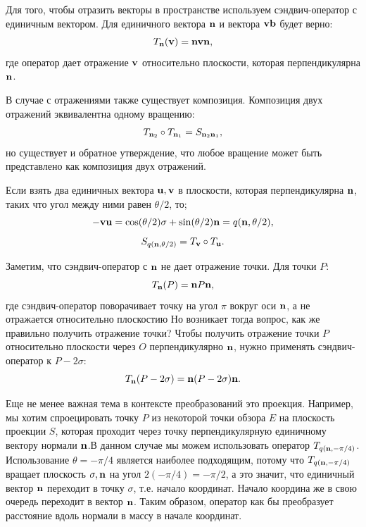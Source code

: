 Для того, чтобы отразить векторы в пространстве используем сэндвич-оператор с единичным вектором. Для единичного вектора $\vb{n}$ и вектора $\vb{vb}$ будет верно:
\begin{equation*}
    T_{\vb{n}}(\vb{v}) = \vb{n}\vb{v}\vb{n},
\end{equation*}
где оператор дает отражение $\vb{v}$ относительно плоскости, которая перпендикулярна $\vb{n}$.

В случае с отражениями также существует композиция. Композиция двух отражений эквивалентна одному вращению:
\begin{equation*}
    T_{\vb{n}_2} \circ T_{\vb{n}_1} = S_{\vb{n}_2\vb{n}_1},
\end{equation*}
но существует и обратное утверждение, что любое вращение может быть представлено как композиция двух отражений.

Если взять два единичных вектора $\vb{u}, \vb{v}$ в плоскости, которая перпендикулярна $\vb{n}$, таких что угол между ними равен $\theta/2$, то;
\begin{equation*}
    -\vb{v}\vb{u} = \cos(\theta/2)\sigma + \sin(\theta/2)\vb{n} = q(\vb{n}, \theta/2),
\end{equation*}
\begin{equation*}
    S_{q(\vb{n}, \theta/2)} = T_{\vb{v}} \circ T_{\vb{u}}.
\end{equation*}

Заметим, что сэндвич-оператор с $\vb{n}$ не дает отражение точки. Для точки $P$:
\begin{equation*}
    T_{\vb{n}}(P) = \vb{n} P \vb{n},
\end{equation*}
где сэндвич-оператор поворачивает точку на угол $\pi$ вокруг оси $\vb{n}$, а не отражается относительно плоскостию Но возникает тогда вопрос, как же правильно получить отражение точки? Чтобы получить отражение точки $P$ относительно плоскости через $O$ перпендикулярно $\vb{n}$, нужно применять сэндвич-оператор к $P - 2\sigma$:
\begin{equation*}
    T_{\vb{n}}(P - 2\sigma) = \vb{n}(P - 2\sigma)\vb{n}.
\end{equation*}

Еще не менее важная тема в контексте преобразований это проекция. Например, мы хотим спроецировать точку $P$ из некоторой точки обзора $E$ на плоскость проекции $S$, которая проходит через точку перпендикулярную единичному вектору нормали $\vb{n}$.В данном случае мы можем использовать оператор $T_{q(\vb{n}, -\pi/4)}$. Использование $\theta = -\pi/4$ является наиболее подходящим, потому что $T_{q(\vb{n}, -\pi/4)}$ вращает плоскость $\sigma, \vb{n}$ на угол $2(-\pi/4) = -\pi/2$, а это значит, что единичный вектор $\vb{n}$ переходит в точку $\sigma$, т.е. начало координат. Начало координа же в свою очередь переходит в вектор $\vb{n}$. Таким образом, оператор как бы преобразует расстояние вдоль нормали в массу в начале координат.

